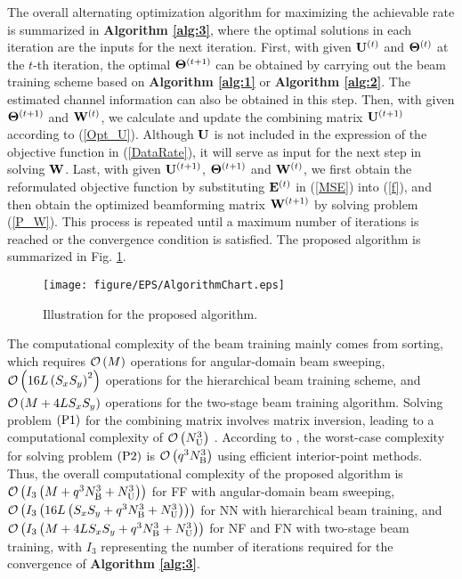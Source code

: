 \documentclass[lettersize, journal]{IEEEtran}
\begin{document}
The overall alternating optimization algorithm for maximizing the achievable rate is summarized in {\bf Algorithm {\ref{alg:3}}}, where the optimal solutions in each iteration are the inputs for the next iteration.
First, with given ${{\bf{U}}^{\left( t \right)}}$ and ${{\bf{\Theta}}^{\left( t \right)}}$ at the $t$-th iteration, the optimal ${{\bf{\Theta}}^{\left( {t + 1} \right)}}$ can be obtained by carrying out the beam training scheme based on {\bf Algorithm {\ref{alg:1}}} or {\bf Algorithm {\ref{alg:2}}}.
The estimated channel information can also be obtained in this step.
Then, with given ${{\bf{\Theta}}^{\left( t+1 \right)}}$ and ${{\bf{W}}^{\left( t \right)}}$, we calculate and update the combining matrix ${{\bf{U}}^{\left( {t + 1} \right)}}$ according to (\ref{Opt_U}).
Although ${\bf{U}}$ is not included in the expression of the objective function in (\ref{DataRate}), it will serve as input for the next step in solving ${{\bf{W}}}$.
Last, with given ${{\bf{U}}^{\left( {t + 1} \right)}}$, ${{\bf{\Theta}}^{\left( t+1 \right)}}$ and ${{\bf{W}}^{\left( t \right)}}$, we first obtain the reformulated objective function by substituting $ {\bf{E}}^{\left( {t } \right)} $ in (\ref{MSE}) into (\ref{f}), and then obtain the optimized beamforming matrix ${{\bf{W}}^{\left( {t + 1} \right)}}$ by solving problem (\ref{P_W}).
This process is repeated until a maximum number of iterations is reached or the convergence condition is satisfied. 
The proposed algorithm is summarized in Fig. {\ref{Fig_AlgorithmChart}}.

\begin{figure}[t]
\begin{center}
\texttt{[image: figure/EPS/AlgorithmChart.eps]}
\caption{Illustration for the proposed algorithm.}
\label{Fig_AlgorithmChart}
\end{center}
\end{figure}

The computational complexity of the beam training mainly comes from sorting, which requires ${\cal O}\left( M \right)$ operations for angular-domain beam sweeping, ${\cal O}\left( 16L\left( S_x  S_y \right)^2 \right)$ operations for the hierarchical beam training scheme, and ${\cal O}\left( M+4L{S_x}{S_y} \right)$ operations for the two-stage beam training algorithm.
Solving problem ${\left( {\rm{P1}} \right)}$ for the combining matrix involves matrix inversion, leading to a computational complexity of ${\cal O}\left( N_{\rm{U}}^3\right)$ {\cite{TWC2021_Double_RIS }}.
According to {\cite{LOBO1998193}}, the worst-case complexity for solving problem ${\left( {\rm{P2}} \right)}$ is ${\cal O}\left( q^3 N_{\rm{B}}^3 \right)$ using efficient interior-point methods. 
Thus, the overall computational complexity of the proposed algorithm is ${\cal O}\left( I_3\left( M + q^3 N_{\rm{B}}^3 + N_{\rm{U}}^3 \right) \right)$ for FF with angular-domain beam sweeping, ${\cal O}\left( I_3\left( 16L\left( S_x  S_y + q^3 N_{\rm{B}}^3 + N_{\rm{U}}^3 \right) \right) \right)$ for NN with hierarchical beam training, and ${\cal O}\left( I_3\left( M+4L{S_x}{S_y} + q^3 N_{\rm{B}}^3 + N_{\rm{U}}^3 \right) \right)$ for NF and FN with two-stage beam training, with $I_3$ representing the number of iterations required for the convergence of {\bf Algorithm {\ref{alg:3}}}.
\end{document}
